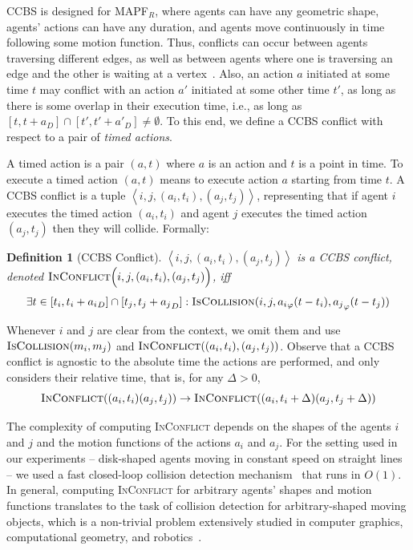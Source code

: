 \documentclass[review]{elsarticle}
\newtheorem{definition}{Definition}
\newcommand{\tuple}[1]{\ensuremath{\left \langle #1 \right \rangle }}
\newcommand\konstantin[1]{\nb{\textbf{Konstantin:}}{red}{#1}}
\newcommand\roni[1]{\nb{\textbf{Roni:}}{green}{#1}}
\newcommand{\ccbs}{\ac{CCBS}\xspace}
\newcommand{\mapfr}{\ac{MAPF}$_R$\xspace}
\newcommand{\iscollision}{\textsc{IsCollision}\xspace}
\newcommand{\inconflict}{\textsc{InConflict}\xspace}
\begin{document}
\ccbs is designed for \mapfr, where agents can have any geometric shape, agents' actions can have any duration, and agents move continuously in time following some motion function.
Thus, conflicts can occur between agents traversing different edges, 
as well as between agents where one is traversing an edge and the other is waiting at a vertex~\cite{li2019multi}. 
Also, an action $a$ initiated at some time $t$ may conflict with an action $a'$ initiated at some other time $t'$, as long as there is some overlap in their execution time, i.e., as long as 
$[t,t+a_D]\cap [t',t'+a'_D]\neq\emptyset$. To this end, we define a \ccbs conflict with respect to a pair of \emph{timed actions}.

A timed action is a pair $(a,t)$ where $a$ is an action and $t$ is a point in time. 
To execute a timed action $(a,t)$ means to execute action $a$ starting from time $t$. 
A \ccbs conflict is a tuple $\tuple{i,j, (a_i, t_i), (a_j, t_j)}$, representing that if agent $i$ executes the timed action $(a_i,t_i)$ and agent $j$ executes the timed action $(a_j,t_j)$ then they will collide. Formally:
\begin{definition}[\ccbs Conflict]
$\tuple{i,j, (a_i, t_i), (a_j, t_j)}$ is a \ccbs conflict, denoted 
$\inconflict \Big(i,j, (a_i,t_i), (a_j,t_j)\Big)$,
iff 
\begin{equation}
\exists t\in [t_i,t_i+{a_i}_D]\cap [t_j,t_j+{a_j}_D]: 
    \iscollision(i,j,{a_i}_\varphi(t-t_i), 
                        {a_j}_\varphi(t-t_j))
\label{eq:inconflict}
\end{equation}
\label{def:ccbs-conflict}
\end{definition}
Whenever $i$ and $j$ are clear from the context, we omit them and use $\iscollision(m_i,m_j)$ and $\inconflict((a_i,t_i), (a_j,t_j))$. 
Observe that 
a \ccbs conflict is agnostic to the absolute time the actions are performed, and only considers their relative time, that is, for any $\Delta>0$, 
\begin{equation}
    \inconflict((a_i,t_i)(a_j,t_j))\rightarrow
    \inconflict((a_i,t_i+\Delta)(a_j,t_j+\Delta))
    \label{eq:delta-invariance}
\end{equation}


The complexity of computing \inconflict depends on the shapes of the agents $i$ and $j$ and the motion functions of the actions $a_i$ and $a_j$. For the setting used in our experiments -- disk-shaped agents moving in constant speed on straight lines -- we used a fast closed-loop collision detection mechanism~\cite{guy2015} that runs in $O(1)$. 
In general, computing \inconflict for arbitrary agents' shapes and motion functions translates to the task of collision detection for arbitrary-shaped moving objects, which is a non-trivial problem extensively studied in computer graphics, computational geometry, and robotics~\cite{jimenez20013d}. 
\end{document}
